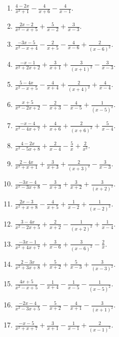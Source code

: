 \documentclass[11pt,oneside]{book}
\begin{document}
\begin{enumerate}[leftmargin=*,label=\textbf{AA\arabic*.},itemsep=0.45\baselineskip]
\item $\displaystyle \frac{4 - 2 x}{x^{2} + 1} - \frac{4}{x + 6} - \frac{4}{x - 1}$.
\item $\displaystyle \frac{2 x - 2}{x^{2} - x + 5} + \frac{5}{x - 2} + \frac{3}{x - 3}$.
\item $\displaystyle \frac{- 3 x - 5}{x^{2} - x + 4} - \frac{2}{x + 5} - \frac{4}{x - 6} + \frac{2}{\left(x - 6\right)^{2}}$.
\item $\displaystyle \frac{- x - 1}{x^{2} + 2 x + 2} + \frac{3}{x + 1} + \frac{3}{\left(x + 1\right)^{2}} - \frac{3}{x - 3}$.
\item $\displaystyle \frac{5 - 4 x}{x^{2} - x + 5} - \frac{4}{x + 4} + \frac{2}{\left(x + 4\right)^{2}} + \frac{4}{x - 4}$.
\item $\displaystyle \frac{x + 5}{x^{2} - 2 x + 2} - \frac{2}{x + 3} - \frac{4}{x - 5} + \frac{1}{\left(x - 5\right)^{2}}$.
\item $\displaystyle \frac{- x - 4}{x^{2} - 4 x + 7} + \frac{4}{x + 6} + \frac{2}{\left(x + 6\right)^{2}} + \frac{5}{x - 4}$.
\item $\displaystyle \frac{4 - 2 x}{x^{2} - 5 x + 8} + \frac{2}{x - 4} - \frac{5}{x} + \frac{2}{x^{2}}$.
\item $\displaystyle \frac{2 - 4 x}{x^{2} + x + 1} + \frac{3}{x + 3} + \frac{2}{\left(x + 3\right)^{2}} - \frac{3}{x - 3}$.
\item $\displaystyle \frac{- 3 x - 4}{x^{2} - 3 x + 8} - \frac{3}{x + 3} + \frac{3}{x + 2} + \frac{3}{\left(x + 2\right)^{2}}$.
\item $\displaystyle \frac{2 x - 3}{x^{2} + x + 8} - \frac{4}{x + 5} + \frac{1}{x - 2} + \frac{1}{\left(x - 2\right)^{2}}$.
\item $\displaystyle \frac{3 - 4 x}{x^{2} - 2 x + 5} + \frac{2}{x + 2} - \frac{1}{\left(x + 2\right)^{2}} + \frac{1}{x - 4}$.
\item $\displaystyle \frac{- 3 x - 1}{x^{2} + 4 x + 7} + \frac{3}{x - 6} + \frac{3}{\left(x - 6\right)^{2}} - \frac{2}{x}$.
\item $\displaystyle \frac{2 - 3 x}{x^{2} + 3 x + 8} + \frac{5}{x + 2} + \frac{5}{x - 3} + \frac{3}{\left(x - 3\right)^{2}}$.
\item $\displaystyle \frac{4 x + 5}{x^{2} - x + 5} - \frac{1}{x + 4} - \frac{1}{x - 5} - \frac{1}{\left(x - 5\right)^{2}}$.
\item $\displaystyle \frac{- 2 x - 4}{x^{2} - 3 x + 5} - \frac{5}{x + 2} - \frac{4}{x + 1} - \frac{3}{\left(x + 1\right)^{2}}$.
\item $\displaystyle \frac{- x - 5}{x^{2} + x + 7} + \frac{3}{x + 1} - \frac{1}{x - 1} + \frac{2}{\left(x - 1\right)^{2}}$.

\end{enumerate}
\end{document}
